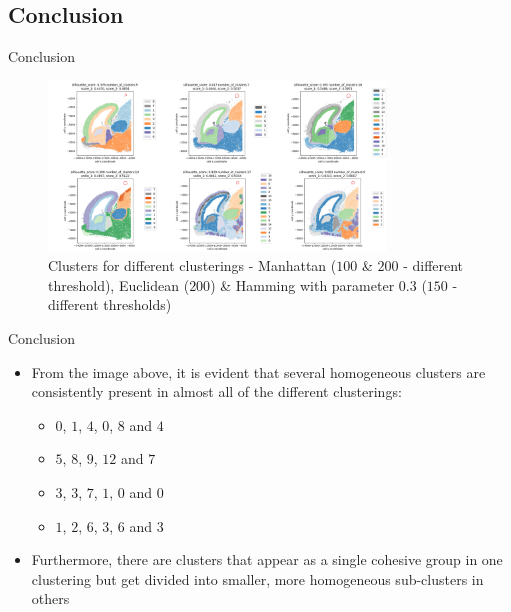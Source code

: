 \documentclass{beamer}
\begin{document}
\subsection{Conclusion}
\begin{frame}{Conclusion}

\begin{figure}
    \centering
    \includegraphics[width=0.8\textwidth]{all_clusters.png}
    \caption{Clusters for different clusterings - Manhattan ($100$ & $200$ - different threshold), Euclidean ($200$) & Hamming with parameter $0.3$ ($150$ - different thresholds)}
\end{figure} 

\end{frame}

\begin{frame}{Conclusion}

\begin{itemize}
    \item<1-> From the image above, it is evident that several homogeneous clusters are consistently present in almost all of the different clusterings:
        \begin{itemize}
            \item<2-> $0$, $1$, $4$, $0$,  $8$ and $4$
            \item<3-> $5$, $8$, $9$, $12$ and $7$
            \item<4-> $3$, $3$, $7$, $1$,  $0$ and $0$
            \item<5-> $1$, $2$, $6$, $3$,  $6$ and $3$
        \end{itemize}
    \item<6-> Furthermore, there are clusters that appear as a single cohesive group in one clustering but get divided into smaller, more homogeneous sub-clusters in others
\end{itemize}

\end{frame}
\end{document}
